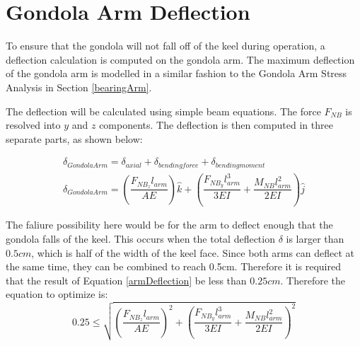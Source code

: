 \documentclass[../main.tex]{subfiles}
\begin{document}
\section{Gondola Arm Deflection} \label{gondDeflection}
To ensure that the gondola will not fall off of the keel during operation, a deflection calculation is computed on the gondola arm. The maximum deflection of the gondola arm is modelled in a similar fashion to the Gondola Arm Stress Analysis in Section \ref{bearingArm}.

The deflection will be calculated using simple beam equations. The force $F_{NB}$ is resolved into $y$ and $z$ components. The deflection is then computed in three separate parts, as shown below:

\begin{align}
	\delta _{Gondola Arm} = \delta _{axial} + \delta _{bending force} + \delta _{bending moment} \\ \label{armDeflection}
	\delta _{Gondola Arm}  = \left(\dfrac{F_{NB_{z}}l_{arm}}{AE}\right)\hat{k} + \left(\dfrac{F_{NB_{y}}l_{arm}^3}{3EI}  + \dfrac{M_{NB}l_{arm}^2}{2EI} \right) \hat{j}
\end{align}

The faliure possibility here would be for the arm to deflect enough that the gondola falls of the keel. This occurs when the total deflection $\delta$ is larger than $0.5cm$, which is half of the width of the keel face. Since both arms can deflect at the same time, they can be combined to reach 0.5cm. Therefore it is required that the result of Equation \ref{armDeflection} be less than $0.25cm$. Therefore the equation to optimize is:
\begin{equation}
	0.25 \leq \sqrt{\left(\dfrac{F_{NB_{z}}l_{arm}}{AE}\right)^2 + \left(\dfrac{F_{NB_{y}}l_{arm}^3}{3EI}  + \dfrac{M_{NB}l_{arm}^2}{2EI} \right)^2}
\end{equation}
\end{document}

